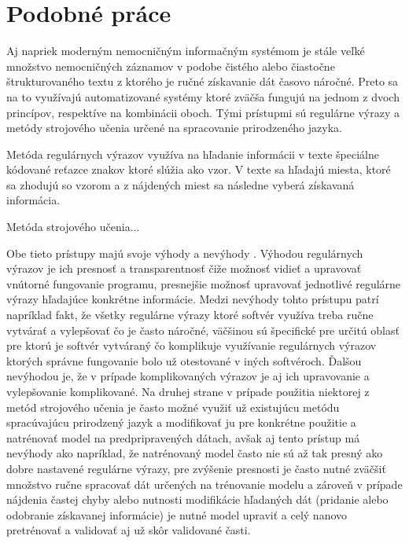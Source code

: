 \chapter{Podobné práce}

Aj napriek moderným nemocničným informačným
systémom je stále veľké množstvo nemocničných záznamov v
podobe čistého alebo čiastočne štrukturovaného 
textu z ktorého je ručné získavanie dát časovo náročné.
Preto sa na to využívajú automatizované systémy
ktoré zväčša fungujú na jednom z dvoch princípov, 
respektíve na kombinácii oboch. Tými prístupmi
sú regulárne výrazy a metódy strojového učenia
určené na spracovanie prirodzeného jazyka.

Metóda regulárnych výrazov využíva na hľadanie informácii v texte
špeciálne kódované reťazce znakov ktoré slúžia ako vzor. 
V texte sa hľadajú miesta, ktoré sa zhodujú so vzorom a z 
nájdených miest sa následne vyberá získavaná informácia.

Metóda strojového učenia...

Obe tieto prístupy majú svoje výhody a nevýhody \cite{nlpAndRegex}. 
Výhodou regulárnych výrazov je ich presnosť a 
transparentnosť čiže možnosť vidieť a upravovať
vnútorné fungovanie programu, presnejšie možnosť 
upravovať jednotlivé regulárne výrazy
hľadajúce konkrétne informácie. Medzi nevýhody tohto prístupu patrí
napríklad fakt, že všetky regulárne výrazy ktoré softvér využíva 
treba ručne vytvárať a vylepšovať
čo je často náročné, väčšinou sú špecifické pre určitú oblasť
pre ktorú je softvér vytváraný čo komplikuje využívanie
regulárnych výrazov ktorých správne fungovanie bolo už 
otestované v iných softvéroch. 
Ďalšou nevýhodou je, že v prípade komplikovaných výrazov je aj ich 
upravovanie a vylepšovanie komplikované. 
Na druhej strane v prípade použitia niektorej
z metód strojového učenia je často možné využiť už 
existujúcu metódu spracúvajúcu prirodzený jazyk a
modifikovať ju pre konkrétne použitie a natrénovať
model na predpripravených dátach, avšak aj tento prístup
má nevýhody ako napríklad, že natrénovaný model
často nie sú až tak presný ako dobre nastavené
regulárne výrazy, pre zvýšenie presnosti je často nutné
zväčšiť množstvo ručne spracovať dát určených na trénovanie 
modelu a zároveň v prípade nájdenia častej chyby alebo 
nutnosti modifikácie hľadaných dát (pridanie alebo 
odobranie získavanej informácie) je nutné model 
upraviť a celý nanovo pretrénovať a validovať aj už
skôr validované časti.

